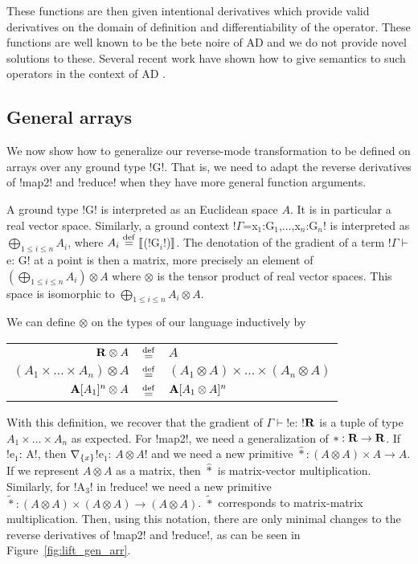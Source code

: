 These functions are then given intentional derivatives which provide valid derivatives 
on the domain of definition and differentiability of the operator. 
These functions are well known to be the bete noire of AD \cite{griewank2008evaluating} 
and we do not provide novel solutions to these.  
Several recent work have shown how to give semantics to such operators in the context of AD \cite{vakar2020denotational,mazza2021automatic,sherman2021,lee2020correctness}.

\subsection{General arrays} %
\label{sub:lift_gen_arr}

We now show how to generalize our reverse-mode transformation to be defined on arrays over any ground type !G!.
That is, we need to adapt the reverse derivatives of !map2! and !reduce! when they have more general function arguments.

A ground type !G! is interpreted as an Euclidean space $A$. 
It is in particular a real vector space.
Similarly, a ground context !$\Gamma$=x$_1$:G$_1$,$\ldots$,x$_n$:G$_n$! is interpreted as $\bigoplus_{1\leq i\leq n}A_i$, where $A_i\stackrel {\mathrm{def}}=\llbracket$(!G$_i$!)$\rrbracket$.
The denotation of the gradient of a term !$\Gamma \vdash$ e: G! at a point is then a matrix, more precisely an element of $(\bigoplus_{1\leq i\leq n}A_i)\otimes A$
where $\otimes$ is the tensor product of real vector spaces. This space is isomorphic to $\bigoplus_{1\leq i\leq n}A_i\otimes A$.

We can define $\otimes$ on the types of our language inductively by

\begin{tabular}{r c l}
    $\mathbf{R} \otimes A$ & $\stackrel {\mathrm{def}}=$ & $A$ \\
    $(A_1 \times \ldots \times A_n)\otimes A$ & $\stackrel {\mathrm{def}}=$ & $(A_1\otimes A) \times \ldots \times (A_n \otimes A)$ \\
    $\mathbf{A}[A_1]^{n} \otimes A$ & $\stackrel {\mathrm{def}}=$ & $\mathbf{A}[A_1\otimes A]^{n}$
\end{tabular}

With this definition, we recover that the gradient of $\Gamma \vdash$!e: !$\mathbf{R}$ is a tuple of type $A_1\times\ldots\times A_n$ as expected.
For !map2!, we need a generalization of $*:\mathbf{R}\to\mathbf{R}$. 
If !e$_1$: A!, then $\nabla_{\{x\}}$!e$_1$: $A\otimes A$! and we need a new primitive $\widehat{*}:(A\otimes A) \times A \to A$.
If we represent $A\otimes A$ as a matrix, then $\widehat{*}$ is matrix-vector multiplication.
Similarly, for !A$_{3}$! in !reduce! we need a new primitive $\widetilde{*}:(A\otimes A)\times(A\otimes A) \to (A\otimes A)$.
$\widetilde{*}$ corresponds to matrix-matrix multiplication.
Then, using this notation, there are only minimal changes to the reverse derivatives of !map2! and !reduce!, as can be seen in Figure~\ref{fig:lift_gen_arr}.


